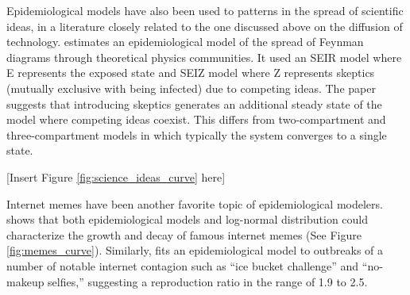 Epidemiological models have also been used to patterns in the spread of scientific ideas, in a literature closely related to the one discussed above on the diffusion of technology.   \href{https://github.com/iworld1991/EpiExp/blob/master/Literature/bettencourt2006power.pdf}{\cite{bettencourt2006power}} estimates an epidemiological model of the spread of Feynman diagrams through theoretical physics communities. It used an SEIR model where E represents the exposed state and SEIZ model where Z represents skeptics (mutually  exclusive with being infected) due to competing ideas. The paper suggests that introducing skeptics generates an additional steady state of the model where competing ideas coexist. This differs from two-compartment and three-compartment models in which typically the system converges to a single state.

\begin{center}
			[Insert Figure \ref{fig:science_ideas_curve} here]
\end{center}

Internet memes have been another favorite topic of epidemiological modelers.  \href{https://github.com/iworld1991/EpiExp/blob/master/Literature/bauckhage2011insights.pdf}{\cite{bauckhage2011insights}} shows that both epidemiological models and log-normal distribution could characterize the growth and decay of famous internet memes (See Figure \ref{fig:memes_curve}).  Similarly,  \href{https://github.com/iworld1991/EpiExp/blob/master/Literature/kucharski2016modelling.pdf}{\cite{kucharski2016modelling}} fits an epidemiological model to outbreaks of a number of notable internet contagion such as ``ice bucket challenge'' and ``no-makeup selfies,'' suggesting a reproduction ratio in the range of 1.9 to 2.5.



